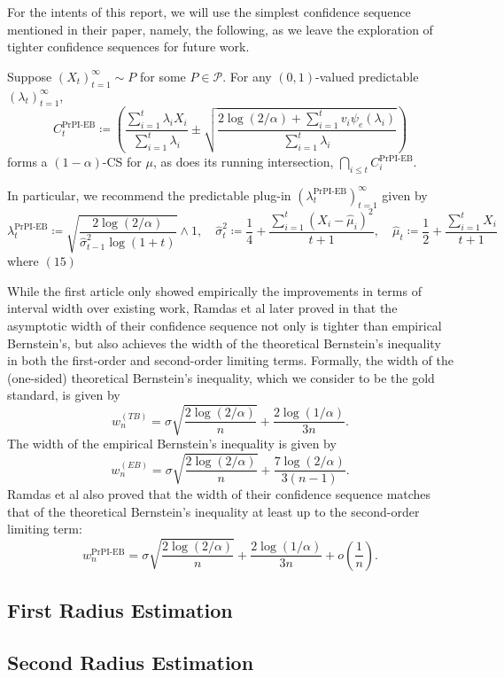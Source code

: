 For the intents of this report, we will use the simplest confidence sequence mentioned in their paper, namely, the following, as we leave the exploration of tighter confidence sequences for future work.
\begin{proposition}
    Suppose $(X_t)_{t=1}^\infty \sim P$ for some $P \in \mathcal{P}$. For any $(0,1)$-valued predictable $(\lambda_t)_{t=1}^\infty$,
    \[
        C_t^{\text{PrPI-EB}} \coloneqq \left( \frac{\sum_{i=1}^t \lambda_i X_i}{\sum_{i=1}^t \lambda_i}\pm \sqrt{\frac{2\log(2/\alpha) + \sum_{i=1}^t v_i \psi_e (\lambda_i)}{\sum_{i=1}^t \lambda_i}} \right)
    \]
    forms a $(1-\alpha)$-CS for $\mu$, as does its running intersection, $\bigcap_{i \leq t} C_i^{\text{PrPI-EB}}$.

    In particular, we recommend the predictable plug-in $(\lambda_t^{\text{PrPI-EB}})_{t=1}^\infty$ given by
    \[
        \lambda_t^{\text{PrPI-EB}} \coloneqq \sqrt{\frac{2\log(2/\alpha)}{\hat{\sigma}_{t-1}^2 \log(1 + t)}} \wedge 1, \quad \hat{\sigma}_t^2 \coloneqq \frac{1}{4} + \frac{\sum_{i=1}^t (X_i - \hat{\mu}_i)^2}{t + 1}, \quad \hat{\mu}_t \coloneqq \frac{1}{2} + \frac{\sum_{i=1}^t X_i}{t + 1}
    \]
    where $(15)$
\end{proposition}

While the first article only showed empirically the improvements in terms of interval width over existing work, Ramdas et al later proved in that the asymptotic width of their confidence sequence not only is tighter than empirical Bernstein's, but also achieves the width of the theoretical Bernstein's inequality in both the first-order and second-order limiting terms.
Formally, the width of the (one-sided) theoretical Bernstein's inequality, which we consider to be the gold standard, is given by
\[
    w_n^{(TB)} = \sigma \sqrt{\frac{2\log(2/\alpha)}{n}} + \frac{2\log(1/\alpha)}{3n}.
\]
The width of the empirical Bernstein's inequality is given by
\[
    w_n^{(EB)} = \sigma \sqrt{\frac{2\log(2/\alpha)}{n}} + \frac{7\log(2/\alpha)}{3(n-1)}.
\]
Ramdas et al also proved that the width of their confidence sequence matches that of the theoretical Bernstein's inequality at least up to the second-order limiting term:
\[
    w_n^{\text{PrPI-EB}} = \sigma \sqrt{\frac{2\log(2/\alpha)}{n}} + \frac{2\log(1/\alpha)}{3n}+{o}\left( \frac{1}{n} \right).
\]

\subsection{First Radius Estimation}\label{subsec:first-radius-estimation-continuous}

\subsection{Second Radius Estimation}\label{subsec:second-radius-estimation-continuous}

